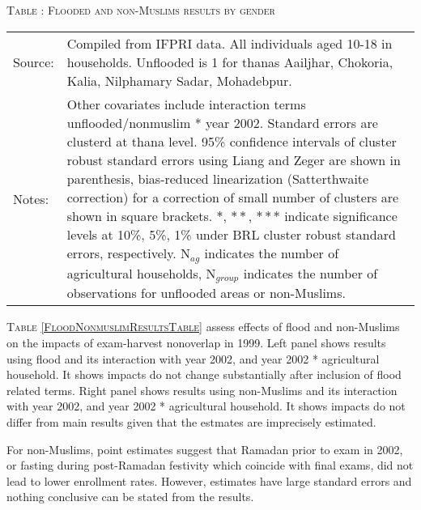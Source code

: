 \clearpage
\begin{table}
\hfil\textsc{\footnotesize Table \thetable: Flooded and non-Muslims results by gender\label{FloodNonmuslimGenderResultsTable}}\\
\setlength{\tabcolsep}{1pt}
\renewcommand{\arraystretch}{.525}
\hspace{-1.5cm}

\renewcommand{\arraystretch}{1}
\hfil\begin{tabular}{>{\hfill\scriptsize}p{1cm}<{}>{\scriptsize}p{12cm}<{\hfill}}
Source:& Compiled from IFPRI data. All individuals aged 10-18 in households. \textsf{Unflooded} is 1 for thanas Aailjhar, Chokoria, Kalia, Nilphamary Sadar, Mohadebpur.\\[-1ex]
Notes:& Other covariates include interaction terms \textsf{unflooded/nonmuslim * year 2002}. Standard errors are clusterd at thana level. 95\% confidence intervals of cluster robust standard errors using Liang and Zeger are shown in parenthesis, bias-reduced linearization (Satterthwaite correction) for a correction of small number of clusters are shown in square brackets. $*$, $**$, $***$ indicate significance levels at 10\%, 5\%, 1\% under BRL cluster robust standard errors, respectively. N$_{ag}$ indicates the number of agricultural households, N$_{group}$ indicates the number of observations for unflooded areas or non-Muslims. 
\end{tabular}
\end{table}


\setlength{\baselineskip}{12pt}

\textsc{\footnotesize Table \ref{FloodNonmuslimResultsTable}} assess effects of flood and non-Muslims on the  impacts of exam-harvest nonoverlap in 1999. Left panel shows results using flood and its interaction with year 2002, and year 2002 * agricultural household. It shows impacts do not change substantially after inclusion of flood related terms. Right panel shows results using non-Muslims and its interaction with year 2002, and year 2002 * agricultural household. It shows impacts do not differ from main results given that the estmates are imprecisely estimated. 

For non-Muslims, point estimates suggest that Ramadan prior to exam in 2002, or fasting during post-Ramadan festivity which coincide with final exams, did not lead to lower enrollment rates. However, estimates have large standard errors and nothing conclusive can be stated from the results.  

